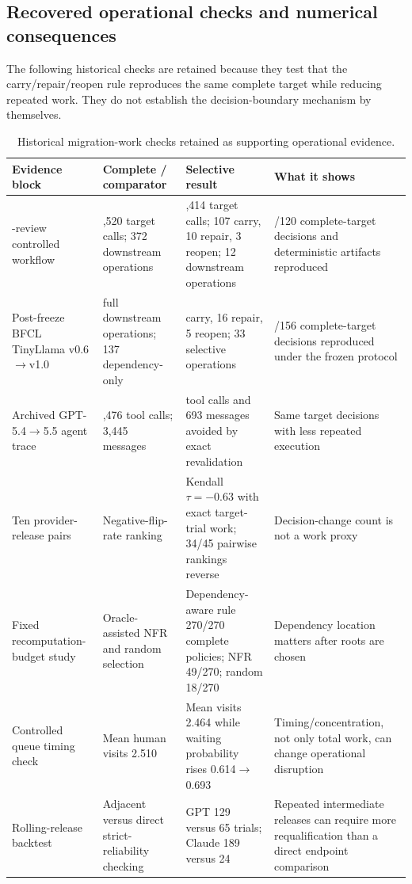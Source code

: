 \documentclass[11pt,letterpaper]{article}
\theoremstyle{plain}
\newcommand{\1}{\mathbf 1}
\begin{document}
\subsection{Recovered operational checks and numerical consequences}
The following historical checks are retained because they test that the carry/repair/reopen rule reproduces the same complete target while reducing repeated work. They do not establish the decision-boundary mechanism by themselves.

\begin{table}[H]
\centering
\caption{Historical migration-work checks retained as supporting operational evidence.}
\label{tab:s_migration_checks}
\small
\setlength{\tabcolsep}{3.5pt}\begin{tabularx}{\textwidth}{>{\raggedright\arraybackslash}p{}>{\raggedright\arraybackslash}p{}>{\raggedright\arraybackslash}p{}>{\raggedright\arraybackslash}X}
\toprule
Evidence block & Complete / comparator & Selective result & What it shows\\
\midrule
120-review controlled workflow & 2,520 target calls; 372 downstream operations & 1,414 target calls; 107 carry, 10 repair, 3 reopen; 12 downstream operations & 120/120 complete-target decisions and deterministic artifacts reproduced\\
Post-freeze BFCL TinyLlama v0.6$\rightarrow$v1.0 & 812 full downstream operations; 137 dependency-only & 135 carry, 16 repair, 5 reopen; 33 selective operations & 156/156 complete-target decisions reproduced under the frozen protocol\\
Archived GPT-5.4$\rightarrow$5.5 agent trace & 1,476 tool calls; 3,445 messages & 310 tool calls and 693 messages avoided by exact revalidation & Same target decisions with less repeated execution\\
Ten provider-release pairs & Negative-flip-rate ranking & Kendall $\tau=-0.63$ with exact target-trial work; 34/45 pairwise rankings reverse & Decision-change count is not a work proxy\\
Fixed recomputation-budget study & Oracle-assisted NFR and random selection & Dependency-aware rule 270/270 complete policies; NFR 49/270; random 18/270 & Dependency location matters after roots are chosen\\
Controlled queue timing check & Mean human visits 2.510 & Mean visits 2.464 while waiting probability rises 0.614$\rightarrow$0.693 & Timing/concentration, not only total work, can change operational disruption\\
Rolling-release backtest & Adjacent versus direct strict-reliability checking & GPT 129 versus 65 trials; Claude 189 versus 24 & Repeated intermediate releases can require more requalification than a direct endpoint comparison\\
\bottomrule
\end{tabularx}
\end{table}
\end{document}
